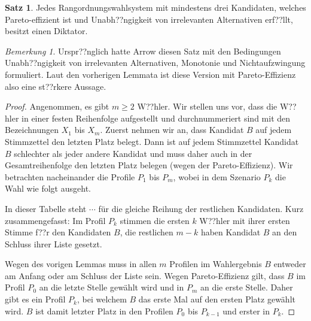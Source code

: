 \documentclass{zirkelblatt1415}
\theoremstyle{definition}
\theoremstyle{definition}
\theoremstyle{definition}
\newtheorem*{thm}{Satz}
\theoremstyle{definition}
\theoremstyle{remark}
\newtheorem*{rmk}{Bemerkung}
\begin{document}
\begin{thm}
Jedes Rangordnungswahlsystem mit mindestens drei Kandidaten, welches Pareto-effizient ist und Unabh??ngigkeit von irrelevanten Alternativen erf??llt, besitzt einen Diktator.
\end{thm}

\begin{rmk}
Urspr??nglich hatte Arrow diesen Satz mit den Bedingungen Unabh??ngigkeit von irrelevanten Alternativen, Monotonie und Nichtaufzwingung formuliert. Laut den vorherigen Lemmata ist diese Version mit Pareto-Effizienz also eine st??rkere Aussage.
\end{rmk}

\begin{proof}
 Angenommen, es gibt $m \geq 2$ W??hler. Wir stellen uns vor, dass die W??hler in einer festen Reihenfolge aufgestellt und durchnummeriert sind mit den Bezeichnungen $X_1$ bis $X_m$. Zuerst nehmen wir an, dass Kandidat $B$ auf jedem Stimmzettel den letzten Platz belegt. Dann ist auf jedem Stimmzettel Kandidat $B$ schlechter als jeder andere Kandidat und muss daher auch in der Gesamtreihenfolge den letzten Platz belegen (wegen der Pareto-Effizienz). Wir betrachten nacheinander die Profile $P_1$ bis $P_m$, wobei in dem Szenario $P_k$ die Wahl wie folgt ausgeht.

\begin{center}
\end{center}

In dieser Tabelle steht $\cdots$ f\"ur die gleiche Reihung der restlichen Kandidaten. Kurz zusammengefasst: Im Profil $P_k$ stimmen die ersten $k$ W??hler mit ihrer ersten Stimme f??r den Kandidaten $B$, die restlichen $m{-}k$ haben Kandidat $B$ an den Schluss ihrer Liste gesetzt.

Wegen des vorigen Lemmas muss in allen $m$ Profilen im Wahlergebnis $B$ entweder am Anfang oder am Schluss der Liste sein. Wegen Pareto-Effizienz gilt, dass $B$ im Profil $P_0$ an die letzte Stelle gew\"ahlt wird und in $P_m$ an die erste Stelle. Daher gibt es ein Profil $P_k$, bei welchem $B$ das erste Mal auf den ersten Platz gew\"ahlt wird. $B$ ist damit letzter Platz in den Profilen $P_0$ bis $P_{k-1}$ und erster in $P_k$.


\end{proof}
\end{document}
